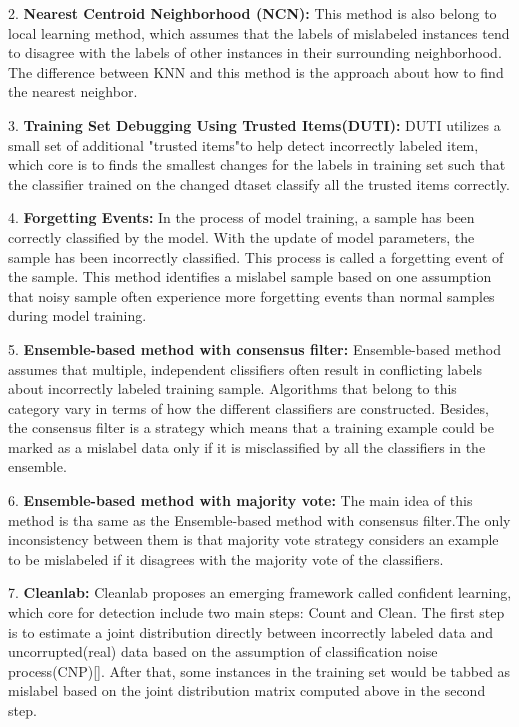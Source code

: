 2. \textbf{Nearest Centroid Neighborhood (NCN):} This method is also belong to local learning method, which assumes that the labels of mislabeled instances tend to disagree with the labels of other instances in their surrounding neighborhood. The difference between KNN and this method is the approach about how to find the nearest neighbor.

3. \textbf{Training Set Debugging Using Trusted Items(DUTI):} DUTI utilizes a small set of additional "trusted items"to help detect incorrectly labeled item, which core is to finds the smallest changes for the labels in training set such that the classifier trained on the changed dtaset classify all the trusted items correctly.

4. \textbf{Forgetting Events:} In the process of model training, a sample has been correctly classified by the model. With the update of model parameters, the sample has been incorrectly classified. This process is called a forgetting event of the sample. This method identifies a mislabel sample based on one assumption that noisy sample often experience more forgetting events than normal samples during model training. 

5. \textbf{Ensemble-based method with consensus filter:}  Ensemble-based method assumes that multiple, independent clissifiers often result in conflicting labels about incorrectly labeled training sample. Algorithms that belong to this category vary in terms of how the different classifiers are constructed. Besides, the consensus filter is a strategy which means that a training example could be marked as a mislabel data only if it is misclassified by all the classifiers in the ensemble.

6. \textbf{Ensemble-based method with majority vote:}  The main idea of this method is tha same as the Ensemble-based method with consensus filter.The only inconsistency between them is that majority vote strategy considers an example to be mislabeled if it disagrees with the majority vote of the classifiers.

7. \textbf{Cleanlab:} Cleanlab proposes an emerging framework called confident learning, which core for detection include two main steps: Count and Clean. The first step is to estimate a joint distribution directly between incorrectly labeled data and uncorrupted(real) data based on the assumption of classification noise process(CNP)[]. After that, some instances in the training set would be tabbed as mislabel based on the joint distribution matrix computed above in the second step.

